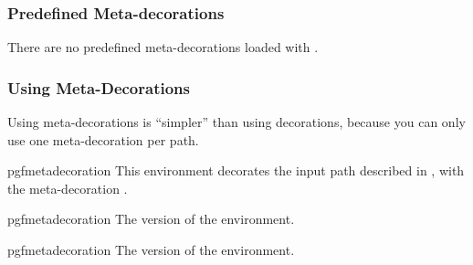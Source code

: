 \subsubsection{Predefined Meta-decorations}

There are no predefined meta-decorations loaded with \pgfname{}.


\subsubsection{Using Meta-Decorations}

Using meta-decorations is ``simpler'' than using decorations, because you can
only use one meta-decoration per path.

\begin{environment}{{pgfmetadecoration}}
    This environment decorates the input path described in , with the meta-decoration .
\end{environment}

\begin{plainenvironment}{{pgfmetadecoration}}
    The  version of the environment.
\end{plainenvironment}

\begin{contextenvironment}{{pgfmetadecoration}}
    The  version of the environment.
\end{contextenvironment}
